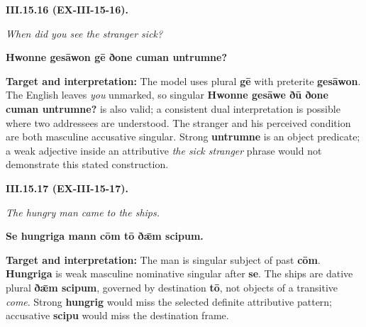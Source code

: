 \par\begin{minipage}{\linewidth}\raggedright
\textbf{III.15.16 (EX-III-15-16).}

\emph{When did you see the stranger sick?}

\textbf{Hwonne gesāwon gē ðone cuman untrumne?}

\textbf{Target and interpretation:} The model uses plural \textbf{gē} with preterite \textbf{gesāwon}. The English leaves \emph{you} unmarked, so singular \textbf{Hwonne gesāwe ðū ðone cuman untrumne?} is also valid; a consistent dual interpretation is possible where two addressees are understood. The stranger and his perceived condition are both masculine accusative singular. Strong \textbf{untrumne} is an object predicate; a weak adjective inside an attributive \emph{the sick stranger} phrase would not demonstrate this stated construction.

\end{minipage}\par\addvspace{4pt}

\par\begin{minipage}{\linewidth}\raggedright
\textbf{III.15.17 (EX-III-15-17).}

\emph{The hungry man came to the ships.}

\textbf{Se hungriga mann cōm tō ðǣm scipum.}

\textbf{Target and interpretation:} The man is singular subject of past \textbf{cōm}. \textbf{Hungriga} is weak masculine nominative singular after \textbf{se}. The ships are dative plural \textbf{ðǣm scipum}, governed by destination \textbf{tō}, not objects of a transitive \emph{come}. Strong \textbf{hungrig} would miss the selected definite attributive pattern; accusative \textbf{scipu} would miss the destination frame.

\end{minipage}\par\addvspace{4pt}

